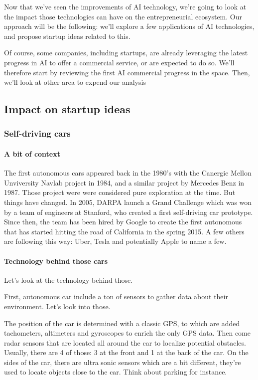 \documentclass[12pt]{article}
\begin{document}
Now that we've seen the improvements of AI technology, we're going to look at
the impact those technologies can have on the entrepreneurial ecosystem.
Our approach will be the following: we'll explore a few applications of AI
technologies, and propose startup ideas related to this.

Of course, some companies, including startups, are already leveraging the latest
progress in AI to offer a commercial service, or are expected to do so.
We'll therefore start by reviewing the first AI commercial progress in the
space. Then, we'll look at other area to expend our analysis

\subsection{Impact on startup ideas}

\subsubsection{Self-driving cars}

\paragraph{A bit of context}

The first autonomous cars appeared back in the 1980's with the Canergie Mellon
Unviversity Navlab project in 1984, and a similar project by Mercedes Benz in
1987. Those project were were considered pure exploration at the time.
But things have changed. In 2005, DARPA launch a Grand Challenge which was won
by a team of engineers at Stanford, who created a first self-driving car
prototype. Since then, the team has been hired by Google to create the first
autonomous that has started hitting the road of California in the spring 2015.
A few others are following this way: Uber, Tesla and potentially Apple to name
a few.

\paragraph{Technology behind those cars}

Let's look at the technology behind those.

First, autonomous car include a ton of sensors to gather data about their
environment. Let's look into those.

The position of the car is determined with a classic GPS, to which are added
tachometers, altimeters and gyroscopes to enrich the only GPS data. Then come
radar sensors that are located all around the car to localize potential
obstacles. Usually, there are 4 of those: 3 at the front and 1 at the back of
the car. On the sides of the car, there are ultra sonic sensors which are a bit
different, they're used to locate objects close to the car. Think about parking
for instance.
\end{document}
